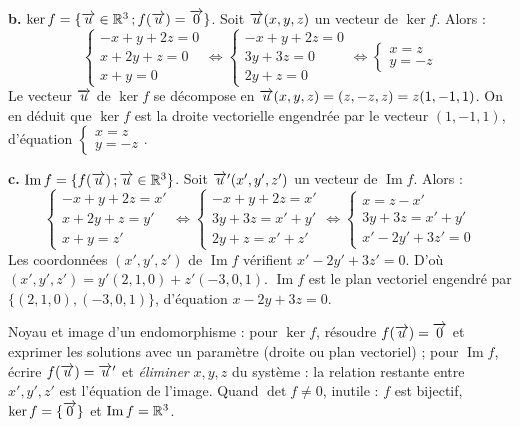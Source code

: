\documentclass[11pt]{article}
\begin{document}
\textbf{b.} $\ker f = \{\overrightarrow{u} \in \mathbb{R}^3\,;f(\overrightarrow{u}) = \overrightarrow{0}\}$. Soit $\overrightarrow{u}(x, y, z)$ un vecteur de $\ker f$. Alors :
\[ \begin{cases} -x + y + 2z = 0 \\ x + 2y + z = 0 \\ x + y = 0 \end{cases} \Longleftrightarrow \begin{cases} -x + y + 2z = 0 \\ 3y + 3z = 0 \\ 2y + z = 0 \end{cases} \Longleftrightarrow \begin{cases} x = z \\ y = -z \end{cases} \]
Le vecteur $\overrightarrow{u}$ de $\ker f$ se décompose en $\overrightarrow{u}(x, y, z) = (z, -z, z) = z(1, -1, 1)$. On en déduit que $\ker f$ est la droite vectorielle engendrée par le vecteur $(1, -1, 1)$, d'équation $\begin{cases} x = z \\ y = -z \end{cases}$.

\textbf{c.} $\operatorname{Im} f = \{f(\overrightarrow{u})\,;\overrightarrow{u} \in \mathbb{R}^3\}$. Soit $\overrightarrow{u}'(x', y', z')$ un vecteur de $\operatorname{Im} f$. Alors :
\[ \begin{cases} -x + y + 2z = x' \\ x + 2y + z = y' \\ x + y = z' \end{cases} \Longleftrightarrow \begin{cases} -x + y + 2z = x' \\ 3y + 3z = x' + y' \\ 2y + z = x' + z' \end{cases} \Longleftrightarrow \begin{cases} x = z - x' \\ 3y + 3z = x' + y' \\ x' - 2y' + 3z' = 0 \end{cases} \]
Les coordonnées $(x', y', z')$ de $\operatorname{Im} f$ vérifient $x' - 2y' + 3z' = 0$. D'où $(x', y', z') = y'(2, 1, 0) + z'(-3, 0, 1)$. $\operatorname{Im} f$ est le plan vectoriel engendré par $\{(2, 1, 0), (-3, 0, 1)\}$, d'équation $x - 2y + 3z = 0$.

\begin{methode}
Noyau et image d'un endomorphisme : pour $\ker f$, résoudre
$f(\overrightarrow{u}) = \overrightarrow{0}$ et exprimer les solutions avec un paramètre
(droite ou plan vectoriel) ; pour $\operatorname{Im} f$, écrire
$f(\overrightarrow{u}) = \overrightarrow{u}'$ et \emph{éliminer} $x, y, z$ du système : la
relation restante entre $x', y', z'$ est l'équation de l'image. Quand
$\det f \ne 0$, inutile : $f$ est bijectif, $\ker f = \{\overrightarrow{0}\}$ et
$\operatorname{Im} f = \mathbb{R}^3$.
\end{methode}
\end{document}
